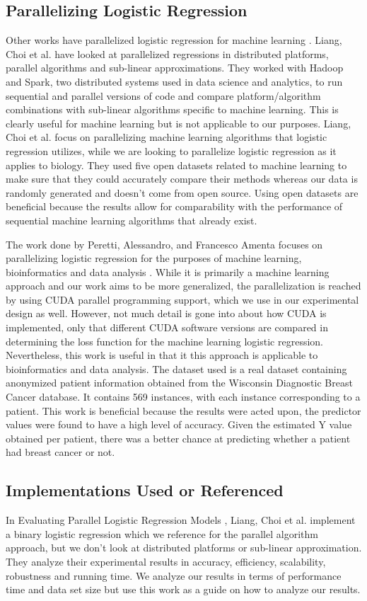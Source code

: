 \documentclass[letterpaper, 10 pt, conference]{ieeeconf}  %
\begin{document}
\subsection{Parallelizing Logistic Regression}
Other works have parallelized logistic regression for machine learning \cite{c2}. Liang, Choi et al. have looked at parallelized regressions in distributed platforms, parallel algorithms and sub-linear approximations. They worked with Hadoop and Spark, two distributed systems used in data science and analytics, to run sequential and parallel versions of code and compare platform/algorithm combinations with sub-linear algorithms specific to machine learning. This is clearly useful for machine learning but is not applicable to our purposes. Liang, Choi et al. focus on parallelizing machine learning algorithms that logistic regression utilizes, while we are looking to parallelize logistic regression as it applies to biology. They used five open datasets related to machine learning to make sure that they could accurately compare their methods whereas our data is randomly generated and doesn’t come from open source. Using open datasets are beneficial because the results allow for comparability with the performance of sequential machine learning algorithms that already exist. 

The work done by Peretti, Alessandro, and Francesco Amenta focuses on parallelizing logistic regression for the purposes of machine learning, bioinformatics and data analysis \cite{c3}. While it is primarily a machine learning approach and our work aims to be more generalized, the parallelization is reached by using CUDA parallel programming support, which we use in our experimental design as well. However, not much detail is gone into about how CUDA is implemented, only that different CUDA software versions are compared in determining the loss function for the machine learning logistic regression. Nevertheless, this work is useful in that it this approach is applicable to bioinformatics and data analysis. The dataset used is a real dataset containing anonymized patient information obtained from the Wisconsin Diagnostic Breast Cancer database. It contains 569 instances, with each instance corresponding to a patient. This work is beneficial because the results were acted upon, the predictor values were found to have a high level of accuracy. Given the estimated Y value obtained per patient, there was a better chance at predicting whether a patient had breast cancer or not.  


\subsection{Implementations Used or Referenced} 
In Evaluating Parallel Logistic Regression Models \cite{c2}, Liang, Choi et al. implement a binary logistic regression which we reference for the parallel algorithm approach, but we don't look at distributed platforms or sub-linear approximation. They analyze their experimental results in accuracy, efficiency, scalability, robustness and running time. We analyze our results in terms of performance time and data set size but use this work as a guide on how to analyze our results. 
\end{document}
